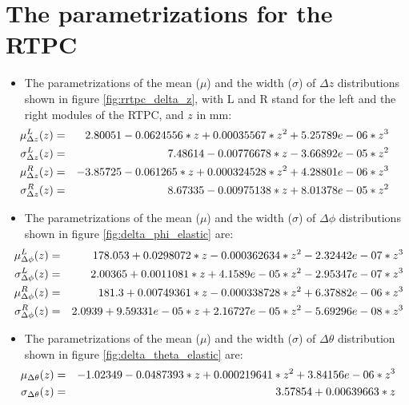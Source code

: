 \normalsize


\chapter{The parametrizations for the RTPC} \label{app:RTPC_appendix}
\begin{itemize}

\item The parametrizations of the mean ($\mu$) and the width ($\sigma$) of 
   $\Delta z$ distributions shown in figure \ref{fig:rrtpc_delta_z}, with L and 
   R stand for the left and the right modules of the RTPC, and $z$ in mm:
\small
\begin{eqnarray}
\hspace{-0.3in} \mu_{\Delta z}^{L}(z) &=& 2.80051 -0.0624556*z +0.00035567*z^{2} +5.25789e-06*z^{3}\\
\hspace{-0.3in} \sigma_{\Delta z}^{L}(z) &=& 7.48614 -0.00776678*z -3.66892e-05*z^{2}\\
\hspace{-0.3in} \mu_{\Delta z}^{R}(z) &=& -3.85725 -0.061265*z +0.000324528*z^{2} +4.28801e-06*z^{3}\\
\hspace{-0.3in} \sigma_{\Delta z}^{R}(z) &=& 8.67335 -0.00975138*z +8.01378e-05*z^{2}
\end{eqnarray}  
\normalsize
\item  The parametrizations of the mean ($\mu$) and the width ($\sigma$) of $\Delta \phi$ distributions shown in figure \ref{fig:delta_phi_elastic} are:
\small
\begin{eqnarray}
\hspace{-0.2in} \mu_{\Delta \phi}^{L}(z) &=& 178.053 +0.0298072*z -0.000362634*z^{2} -2.32442e-07*z^{3}\\
\hspace{-0.2in} \sigma_{\Delta \phi}^{L}(z) &=& 2.00365 +0.0011081*z +4.1589e-05*z^{2} -2.95347e-07*z^{3}\\
\hspace{-0.2in} \mu_{\Delta \phi}^{R}(z) &=& 181.3 +0.00749361*z -0.000338728*z^{2} +6.37882e-06*z^{3}\\
\hspace{-0.2in} \sigma_{\Delta \phi}^{R}(z) &=& 2.0939 +9.59331e-05*z +2.16727e-05*z^{2} -5.69296e-08*z^{3}
\end{eqnarray} 
\normalsize

\item The parametrizations of the mean ($\mu$) and the width ($\sigma$) of $\Delta \theta$ distribution shown in figure \ref{fig:delta_theta_elastic} are: 
\small
\begin{eqnarray}
\hspace{-0.2in} \mu_{\Delta \theta}(z) &=& -1.02349 -0.0487393*z +0.000219641*z^{2} +3.84156e-06*z^{3}\\
\hspace{-0.2in} \sigma_{\Delta \theta}(z) &=& 3.57854 +0.00639663*z
\end{eqnarray}
\normalsize


\end{itemize}
